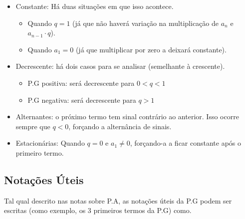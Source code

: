 \documentclass[11pt]{article}
\begin{document}
\begin{tcolorbox}[colback=LightYellow]
\begin{itemize}
  \item Constante: Há duas situações em que isso acontece.
        \begin{itemize}
                \item Quando $q = 1$ (já que não haverá variação na multiplicação de $a_{n}$ e $a_{n - 1}\cdot q$).
                \item Quando $a_{1} = 0$ (já que multiplicar por zero a deixará constante).
        \end{itemize}
\end{itemize}
\end{tcolorbox}

\begin{tcolorbox}[colback=LightYellow]
\begin{itemize}
  \item Decrescente: há dois casos para se analisar (semelhante à crescente).
        \begin{itemize}
                \item P.G positiva: será decrescente para $0 < q < 1$
                \item P.G negativa: será decrescente para $q > 1$
        \end{itemize}
\end{itemize}
\end{tcolorbox}

\begin{tcolorbox}[colback=LightYellow]
\begin{itemize}
  \item Alternantes: o próximo termo tem sinal contrário ao anterior. Isso ocorre sempre que $q < 0$, forçando a alternância de sinais.

  \item Estacionárias: Quando $q = 0$ e $a_{1} \neq 0$, forçando-a a ficar constante após o primeiro termo.
\end{itemize}
\end{tcolorbox}

\subsection{Notações Úteis}

Tal qual descrito nas notas sobre P.A, as notações úteis da P.G podem ser escritas (como exemplo, os 3 primeiros termos da P.G) como.
\end{document}
